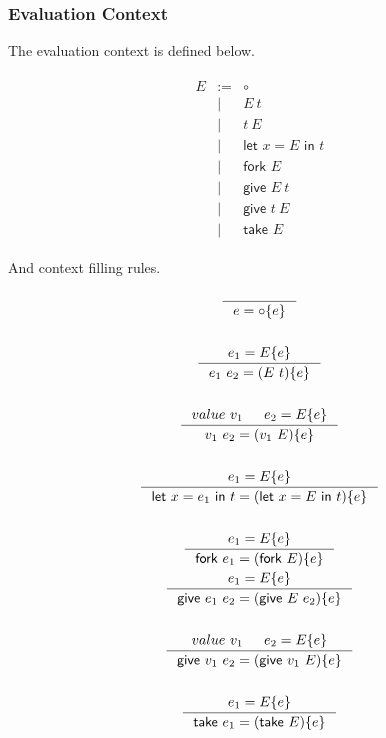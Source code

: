 \documentclass{article}
\newcommand{\sco}[1]{\textsf{#1}}
\newcommand{\letin}[3]{\sco{let } #1 = #2 \sco{ in } #3}
\newcommand{\fork}[1]{\sco{fork }#1}
\newcommand{\give}[2]{\sco{give } #1\ #2}
\newcommand{\take}[1]{\sco{take } #1}
\begin{document}
\subsubsection{Evaluation Context}

The evaluation context is defined below.

\begin{gather*}
    \begin{array}{rrl}
        E & := & \circ  \\
          & |  & E\ t    \\
          & |  & t\ E    \\
          & |  & \letin{x}{E}{t} \\
          & |  & \fork{E} \\
          & |  & \give{E}{t} \\
          & |  & \give{t}{E} \\
          & |  & \take{E}
    \end{array}
\end{gather*}

And context filling rules.

\begin{gather*}
    \inference{}{
        e = \circ\{e\}
    }\\
    \\
    \inference{
        e_1 = E\{e\}
    }{
        e_1\ e_2 = (E\ t)\{e\}
    }\\
    \\
    \inference{
        value\ v_1 & e_2 = E\{e\}
    }{
        v_1\ e_2 = (v_1\ E)\{e\}
    }\\
    \\
    \inference{
        e_1 = E\{e\}
    }{
        \letin{x}{e_1}{t} = (\letin{x}{E}{t})\{e\}
    }\\
    \\
    \inference{
        e_1 = E\{e\}
    }{
        \fork{e_1} = (\fork{E})\{e\}
    }\\
    \inference{
        e_1 = E\{e\}
    }{
        \give{e_1}{e_2} = (\give{E}{e_2})\{e\}
    }\\
    \\
    \inference{
        value\ v_1 & e_2 = E\{e\}
    }{
        \give{v_1}{e_2} = (\give{v_1}{E})\{e\}
    }\\
    \\
    \inference{
        e_1 = E\{e\}
    }{
        \take{e_1} = (\take{E})\{e\}
    }
\end{gather*}
\end{document}
